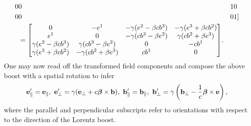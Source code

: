 \begin{align*}
		0            & 0            & 1 & 0 \\
		0            & 0            & 0 & 1
	] \\
	  &=
	\mqty[
		0                             & -e^{1}                        & -\gamma(e^{2} - \beta cb^{3})  & -\gamma(e^{3} + \beta cb^{2}) \\
		e^{1}                        & 0                             & -\gamma(cb^{3} - \beta e^{2})  & \gamma(cb^{2} + \beta e^{3}) \\
		\gamma(e^{2} - \beta cb^{3}) & \gamma(cb^{3} - \beta e^{2}) & 0                             & -cb^{1} \\
		\gamma(e^{3} + \beta cb^{2}) & -\gamma(cb^{2} + \beta e^{3})  & cb^{1}                       & 0
	].
\end{align*}
One may now read off the transformed field components and compose the above boost with a spatial rotation to infer
\begin{align*}
	\vb{e}_{\parallel}^{\prime} = \vb{e}_{\parallel},\ \vb{e}_{\perp}^{\prime} = \gamma(\vb{e}_{\perp} + c\vb*{\beta}\times\vb{b}),\ \vb{b}_{\parallel}^{\prime} = \vb{b}_{\parallel},\ \vb{b}_{\perp}^{\prime} = \gamma\left(\vb{b}_{\perp} - \frac{1}{c}\vb*{\beta}\times\vb{e}\right),
\end{align*}
where the parallel and perpendicular subscripts refer to orientations with respect to the direction of the Lorentz boost.

